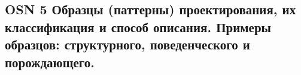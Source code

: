 \subsection{OSN 5 Образцы (паттерны) проектирования, их классификация и способ описания. Примеры образцов: структурного, поведенческого и порождающего.}

